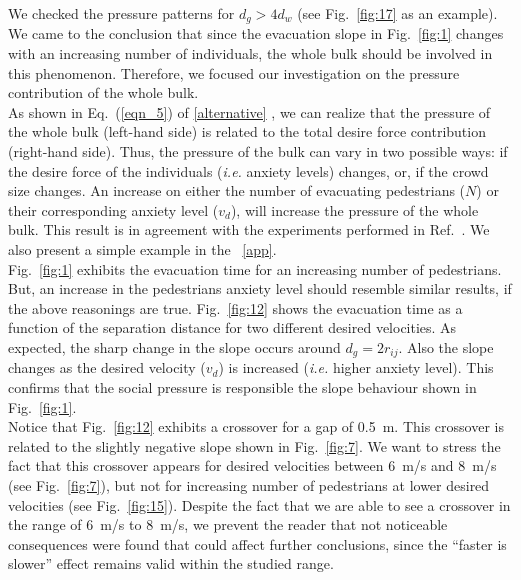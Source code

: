 We checked the pressure patterns for $d_g>4d_w$ (see Fig.~\ref{fig:17} as an 
example). We came to the conclusion that since the evacuation slope in 
Fig.~\ref{fig:1} changes with an increasing number of individuals, the whole 
bulk should be involved in this phenomenon. Therefore, we focused our 
investigation on the pressure contribution of the whole bulk.  \\ 

As shown in Eq.~(\ref{eqn_5}) of \ref{alternative} , we can realize that the pressure of the 
whole bulk (left-hand side) is related to the total desire force contribution 
(right-hand side). Thus, the pressure of the bulk can vary in two possible 
ways: if the desire force of the individuals (\emph{i.e.} anxiety levels) 
changes, or, if the crowd size changes. An increase on either 
the number of evacuating pedestrians ($N$) or their corresponding anxiety 
level ($v_d$), will increase the pressure of the whole bulk. {\color{red} This result is in agreement with the experiments performed in Ref.~\cite{Pastor}.}
We also present a simple example in the ~\ref{app}. \\

Fig.~\ref{fig:1} exhibits the evacuation time for an increasing number of 
pedestrians. But, an increase in the pedestrians anxiety level should  
resemble similar results, if the above reasonings are true. Fig.~\ref{fig:12} 
shows the evacuation time as a function of the separation distance for two 
different desired velocities. As expected, the sharp change in the slope occurs 
around $d_g=2r_{ij}$. Also the slope changes as the desired velocity ($v_d$) is 
increased (\emph{i.e.} higher anxiety level). This confirms that the social 
pressure is responsible the slope behaviour shown in Fig.~\ref{fig:1}. \\

{\color{red} Notice that Fig.~\ref{fig:12} exhibits a crossover for a gap of 0.5~m. This crossover is related to the slightly negative slope shown in Fig.~\ref{fig:7}. We want to stress the fact that this crossover appears for desired velocities between 6~m/s and 8~m/s (see  Fig.~\ref{fig:7}), but not for increasing number of pedestrians at lower desired velocities (see Fig.~\ref{fig:15}). Despite the fact that we are able to see a crossover in the range of 6~m/s to 8~m/s, we prevent the reader that not noticeable consequences were found that could affect further conclusions, since the ``faster is slower'' effect remains valid within the studied range.}\\


